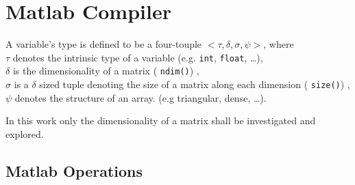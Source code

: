 \chapter{Matlab Compiler} \label{chap:matlab_compiler}


\begin{definition}\cite{slice-chauhan}
\label{def:var}
\textnormal{
A variable's type is defined to be a four-touple $<\tau, \delta, \sigma, \psi>$, where \\
$\tau$     denotes the intrinsic type of a variable (e.g. \texttt{int}, \texttt{float}, \dots),\\
$\delta$   is the dimensionality of a matrix ( \texttt{ndim()}) ,\\
$\sigma$   is a $\delta$ sized tuple denoting the size of a matrix along each dimension ( \texttt{size()}) ,\\
$\psi$     denotes the structure of an array. (e.g triangular, dense, \dots).
}
\end{definition}


In this work only the dimensionality of a matrix shall be investigated and explored. 



\section{Matlab Operations}\label{sec:mat_op}
